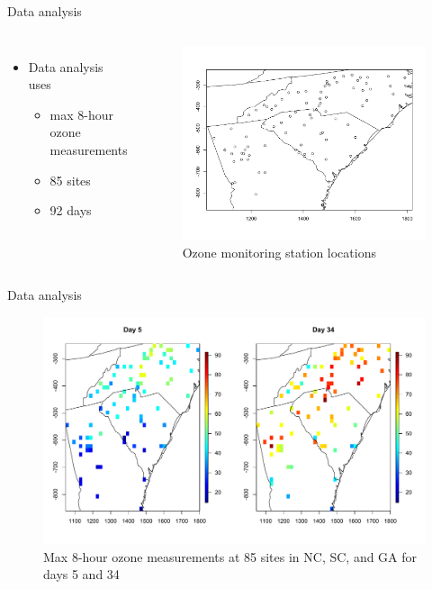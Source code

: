 \documentclass{beamer}
\begin{document}
\begin{frame}{Data analysis}
\begin{columns}[c]
	\begin{itemize} \setlength{\itemsep}{0.5em}
	\item Data analysis uses
	\begin{itemize}
		\item max 8-hour ozone measurements
		\item 85 sites
		\item 92 days
	\end{itemize}
	\end{itemize}

	\begin{figure}
    \includegraphics[width=1\linewidth]{./plots/ozone_station.pdf}
    \caption{Ozone monitoring station locations}
    \end{figure}
\end{columns}
\end{frame}

\begin{frame}{Data analysis}
  \centering
  \begin{figure}
    \includegraphics[width=1\linewidth]{./plots/ozone-day.pdf}
    \caption{Max 8-hour ozone measurements at 85 sites in NC, SC, and GA for days 5 and 34}
   \end{figure}

\end{frame}
\end{document}
